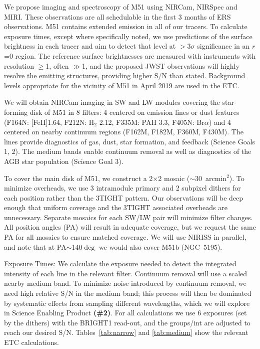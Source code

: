 \documentclass[12pt]{article}
\begin{document}
\vspace{-0.1in}
We propose imaging and spectroscopy of M51 using NIRCam, NIRSpec and MIRI. These observations are all schedulable in the first 3 months of ERS observations. M51 contains extended emission in all of our tracers. To calculate exposure times, except where specifically noted, we use predictions of the surface brightness in each tracer and aim to detect that level at $>$3$\sigma$ significance in an $r$=0 region. The reference surface brightnesses are measured with instruments with resolution $\geq$1\arcsec, often $\gg$1\arcsec, and the proposed JWST observations will highly resolve the emitting structures, providing higher S/N than stated. Background levels appropriate for the vicinity of M51 in April 2019 are used in the ETC. 

\vspace{0.05in}

 We will obtain NIRCam imaging in SW and LW modules covering the star-forming disk of M51 in 8 filters: 4 centered on emission lines or dust features (F164N: [Fe{\small II}]1.64\micron, F212N: H$_2$ 2.12\micron, F335M: PAH 3.3\micron, F405N: Br$\alpha$) and 4 centered on nearby continuum regions (F162M, F182M, F360M, F430M). The lines provide diagnostics of gas, dust, star formation, and feedback (Science Goals 1, 2).  The medium bands enable continuum removal as well as diagnostics of the AGB star population (Science Goal 3).  

To cover the main disk of M51, we construct a 2$\times$2 mosaic ($\sim$30~arcmin$^2$). To minimize overheads, we use 3 intramodule primary and 2 subpixel dithers for each position rather than the 3TIGHT pattern. Our observations will be deep enough that uniform coverage and the 3TIGHT associated overheads are unnecessary.  
Separate mosaics for each SW/LW pair will minimize filter changes. All position angles (PA) will result in adequate coverage, but we request the same PA for all mosaics to ensure matched coverage. We will use NIRISS in parallel, and note that at PA$\sim$140$\deg$ we would also cover M51b (NGC~5195).

\vspace{0.05in}

\noindent \underline{Exposure Times:} We calculate the exposure needed to detect the integrated intensity of each line in the relevant filter. Continuum removal will use a scaled nearby medium band. To minimize noise introduced by continuum removal, we need high relative S/N in the medium band; this process will then be dominated by systematic effects from sampling different wavelengths, which we will explore in Science Enabling Product {\bf (\#2)}. 
For all calculations we use 6 exposures (set by the dithers) with the BRIGHT1 read-out, 
and the groups/int are adjusted to reach our desired S/N. Tables~\ref{tab:narrow} and \ref{tab:medium} show the relevant ETC calculations.
\end{document}
